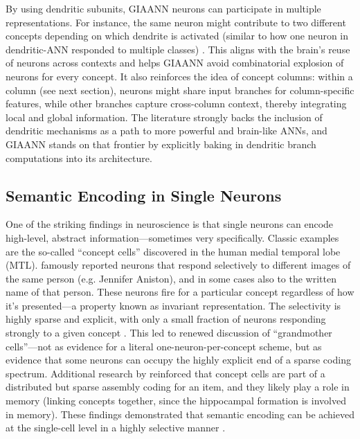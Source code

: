 By using dendritic subunits, GIAANN neurons can participate in multiple representations.
For instance, the same neuron might contribute to two different concepts depending on which dendrite is activated (similar to how one neuron in dendritic-ANN responded to multiple classes) \citep{chavlis2025dendrites}.
This aligns with the brain’s reuse of neurons across contexts and helps GIAANN avoid combinatorial explosion of neurons for every concept.
It also reinforces the idea of concept columns: within a column (see next section), neurons might share input branches for column-specific features, while other branches capture cross-column context, thereby integrating local and global information.
The literature strongly backs the inclusion of dendritic mechanisms as a path to more powerful and brain-like ANNs, and GIAANN stands on that frontier by explicitly baking in dendritic branch computations into its architecture.

\subsection{Semantic Encoding in Single Neurons}

One of the striking findings in neuroscience is that single neurons can encode high-level, abstract information---sometimes very specifically.
Classic examples are the so-called ``concept cells'' discovered in the human medial temporal lobe (MTL).
\citet{quiroga2005concept} famously reported neurons that respond selectively to different images of the same person (e.g. Jennifer Aniston), and in some cases also to the written name of that person.
These neurons fire for a particular concept regardless of how it’s presented---a property known as invariant representation.
The selectivity is highly sparse and explicit, with only a small fraction of neurons responding strongly to a given concept \citep{quianQuiroga2012conceptCells}.
This led to renewed discussion of ``grandmother cells''---not as evidence for a literal one-neuron-per-concept scheme, but as evidence that some neurons can occupy the highly explicit end of a sparse coding spectrum.
Additional research by \citet{quianQuiroga2012conceptCells} reinforced that concept cells are part of a distributed but sparse assembly coding for an item, and they likely play a role in memory (linking concepts together, since the hippocampal formation is involved in memory).
These findings demonstrated that semantic encoding can be achieved at the single-cell level in a highly selective manner \citep{quiroga2005concept}.


